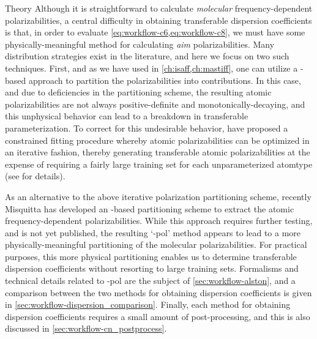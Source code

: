 \begin{subsubsection}{Theory}
Although it is straightforward to calculate \emph{molecular} frequency-dependent
polarizabilities, a central difficulty in obtaining transferable dispersion
coefficients is that, 
in order to evaluate \cref{eq:workflow-c6,eq:workflow-c8},
we must have some physically-meaningful method for
calculating \emph{\acrlong{aim}} polarizabilities.
Many
distribution strategies exist in the literature, and here we focus on two such
techniques. First, and as we have used in \cref{ch:isaff,ch:mastiff}, one can
utilize a
\dma-based approach to partition the polarizabilities into \aim
contributions. In this case, and due to deficiencies in the \dma partitioning
scheme,
the resulting atomic polarizabilities are not always 
positive-definite and monotonically-decaying, and this unphysical behavior can lead to a breakdown in
transferable parameterization.\cite{Williams2003}
To correct for this undesirable behavior, \citeauthor{McDaniel2013} have
proposed a constrained
fitting procedure whereby atomic polarizabilities can be optimized in an
iterative fashion, thereby generating transferable atomic polarizabilities at
the expense of requiring a fairly large training set for each unparameterized atomtype
(see  for details).

As an alternative to the above iterative polarization partitioning scheme, recently
Misquitta has developed an \isa-based partitioning scheme to extract the
atomic frequency-dependent polarizabilities. While this approach requires
further testing, and is not yet published,
the resulting `\isa-pol' method appears to lead to a more
physically-meaningful partitioning of the molecular polarizabilities. For
practical purposes, this more physical partitioning 
enables us to determine transferable dispersion coefficients without
resorting to large training sets. Formalisms and technical details
related to \isa-pol are the subject of \cref{sec:workflow-alston}, and a
comparison between the two methods for obtaining dispersion coefficients is
given in \cref{sec:workflow-dispersion_comparison}. Finally, each method for
obtaining dispersion coefficients requires a small amount of post-processing,
and this is also discussed in \cref{sec:workflow-cn_postprocess}.

\end{subsubsection}

